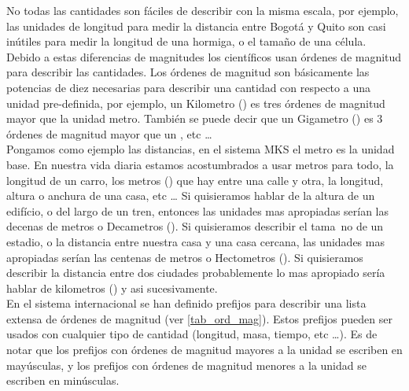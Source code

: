 No todas las cantidades son f\'aciles de describir con la misma escala, por ejemplo, las unidades de longitud para medir la distancia entre Bogot\'a y Quito son casi in\'utiles para medir la longitud de una hormiga, o el tama\~no de una c\'elula. Debido a estas diferencias de magnitudes los cient\'ificos usan \'ordenes de magnitud para describir las cantidades. Los \'ordenes de magnitud son b\'asicamente las potencias de diez necesarias para describir una cantidad con respecto a una unidad pre-definida, por ejemplo, un Kilometro (\km) es tres \'ordenes de magnitud mayor que la unidad metro. Tambi\'en se puede decir que un Gigametro (\gm) es 3 \'ordenes de magnitud mayor que un \km, etc \ldots \\ 
Pongamos como ejemplo las distancias, en el sistema MKS el metro es la unidad base. En nuestra vida diaria estamos acostumbrados a usar metros para todo, la longitud de un carro, los metros (\m) que hay entre una calle y otra, la longitud, altura o anchura de una casa, etc \ldots
Si quisieramos hablar de la altura de un edif\'icio, o del largo de un tren, entonces las unidades mas apropiadas ser\'ian las decenas de metros o Decametros (\Dm). Si quisieramos describir el tama~no de un estadio, o la distancia entre nuestra casa y una casa cercana, las unidades mas apropiadas ser\'ian las centenas de metros o Hectometros (\Hm). 
Si quisieramos describir la distancia entre dos ciudades probablemente lo mas apropiado ser\'ia hablar de kilometros (\km) y asi sucesivamente. \\
En el sistema internacional se han definido prefijos para describir una lista extensa de \'ordenes de magnitud (ver \ref{tab_ord_mag}). Estos prefijos pueden ser usados con cualquier tipo de cantidad (longitud, masa, tiempo, etc \ldots). Es de notar que los prefijos con \'ordenes de magnitud mayores a la unidad se escriben en may\'usculas, y los prefijos con \'ordenes de magnitud menores a la unidad se escriben en min\'usculas. \\
